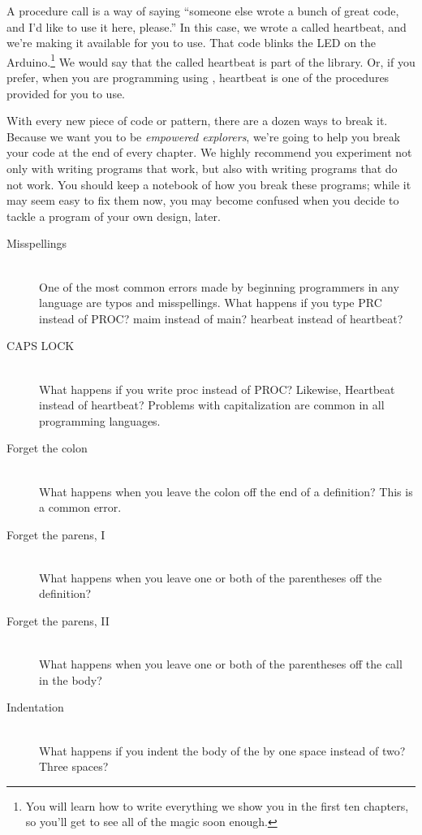 A procedure call is a way of saying ``someone else wrote a bunch of great code, and I'd like to use it here, please.'' In this case, we wrote a \PROC called {\code heartbeat}, and we're making it available for you to use. That code blinks the LED on the Arduino.\footnote{You will learn how to write everything we show you in the first ten chapters, so you'll get to see all of the magic soon enough.} We would say that the \PROC called {\code heartbeat} is part of the \plumbing library. Or, if you prefer, when you are programming using \plumbing, {\code heartbeat} is one of the procedures provided for you to use.

\BREAKAGE
With every new piece of code or pattern, there are a dozen ways to break it. Because we want you to be {\em empowered explorers}, we're going to help you break your code at the end of every chapter. We highly recommend you experiment not only with writing programs that work, but also with writing programs that {\strong do not} work. You should keep a notebook of how you break these programs; while it may seem easy to fix them now, you may become confused when you decide to tackle a program of your own design, later.

\begin{description}
  \item[Misspellings]\ \\ One of the most common errors made by beginning programmers in any language are typos and misspellings. What happens if you type {\code PRC} instead of {\code PROC}? {\code maim} instead of {\code main}? {\code hearbeat} instead of {\code heartbeat}?

	\item[CAPS LOCK]\ \\ What happens if you write {\code proc} instead of {\code PROC}? Likewise, {\code Heartbeat} instead of {\code heartbeat}? Problems with capitalization are common in all programming languages.

	\item[Forget the colon]\ \\ What happens when you leave the colon off the end of a \PROC definition? This is a  common error.
	
	\item[Forget the parens, I]\ \\ What happens when you leave one or both of the parentheses off the \PROC definition?
	
	\item[Forget the parens, II]\ \\ What happens when you leave one or both of the parentheses off the \PROC call in the body?
	
	\item[Indentation]\ \\ What happens if you indent the body of the \PROC by one space instead of two? Three spaces? 
\end{description}

